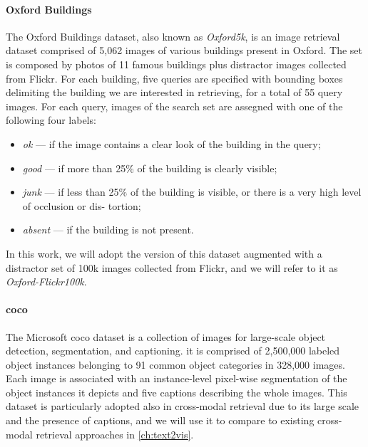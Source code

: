 \paragraph{Oxford Buildings~\cite{philbin2007object}}
The Oxford Buildings dataset, also known as \emph{Oxford5k}, is an image retrieval dataset comprised of 5,062 images of various buildings present in Oxford.
The set is composed by photos of 11 famous buildings plus distractor images collected from Flickr.
For each building, five queries are specified with bounding boxes delimiting the building we are interested in retrieving, for a total of 55 query images.
For each query, images of the search set are assegned with one of the following four labels:
\begin{itemize}
    \item \emph{ok} --- if the image contains a clear look of the building in the query;
    \item \emph{good} --- if more than 25\% of the building is clearly visible;
    \item \emph{junk} --- if less than 25\% of the building
is visible, or there is a very high level of occlusion or dis-
tortion;
    \item \emph{absent} --- if the building is not present.
\end{itemize}
In this work, we will adopt the version of this dataset augmented with a distractor set of 100k images collected from Flickr, and we will refer to it as \emph{Oxford-Flickr100k}.


\paragraph{\acrfull{coco}~\cite{lin2014microsoft}}

The Microsoft \acrfull{coco} dataset is a collection of images  for large-scale object detection, segmentation, and captioning.
it is comprised of 2,500,000 labeled object instances belonging to 91 common object categories in 328,000 images.
Each image is associated with an instance-level pixel-wise segmentation of the object instances it depicts and five captions describing the whole images.
This dataset is particularly adopted also in cross-modal retrieval due to its large scale and the presence of captions, and we will use it to compare to existing cross-modal retrieval approaches in \ref{ch:text2vis}.

